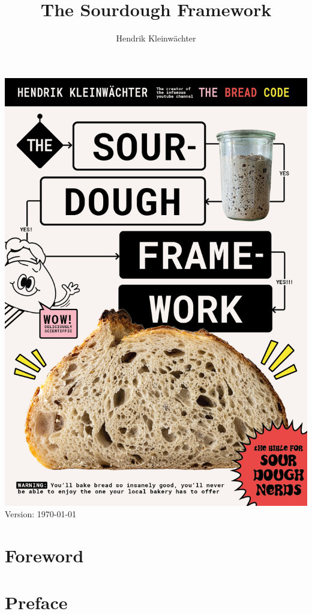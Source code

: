 \documentclass[a4paper, 12pt]{book}
\author{Hendrik Kleinwächter}
\title{The Sourdough Framework}
\begin{document}
\begin{titlepage}
\begin{center}
  \includegraphics[width=\textwidth]{images/cover-page.jpg}
  Version:
  \today
\end{center}
\end{titlepage}

\frontmatter

\tableofcontents

\chapter{Foreword}


\chapter{Preface}

\end{document}

